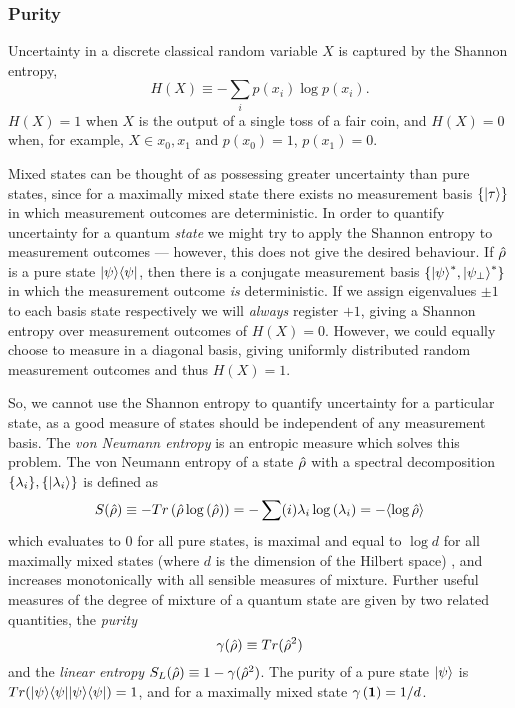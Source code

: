 \subsubsection{Purity}
Uncertainty in a discrete classical random variable $X$ is captured by the Shannon entropy, 
\begin{equation}
H(X) \equiv - \sum_i p(x_i) \log p(x_i).
\end{equation}
$H(X) = 1$ when $X$ is the output of a single toss of a fair coin, and $H(X) = 0$ when, for example, $X \in {x_0, x_1}$ and $p(x_0)=1$, $p(x_1)=0$.

Mixed states can be thought of as possessing greater uncertainty than pure states, since for a maximally mixed state there exists no measurement basis $\{ \mbox{$ | \tau \rangle $} \}$ in which measurement outcomes are deterministic.
In order to quantify uncertainty for a quantum \emph{state} we might try to apply the Shannon entropy to measurement outcomes --- however, this does not give the desired behaviour.  If $\hat{\rho}$ is a pure state $\mbox{$ | \psi \rangle $}\mbox{$ \langle \psi | $}$, then there is a conjugate measurement basis $\{\mbox{$ | \psi \rangle $}^*, \mbox{$ | \psi_\perp \rangle $}^* \}$ in which the measurement outcome \emph{is} deterministic. If we assign eigenvalues $\pm1$ to each basis state respectively we will \emph{always} register $+1$, giving a Shannon entropy over measurement outcomes of $H(X)=0$.  However, we could equally choose to measure in a diagonal basis, giving uniformly distributed random measurement outcomes and thus $H(X)=1$. 

So, we cannot use the Shannon entropy to quantify uncertainty for a particular state, as a good measure of states should be independent of any measurement basis.  
The \emph{von Neumann entropy} is an entropic measure which solves this problem. The von Neumann entropy of a state $\hat{\rho}$ with a spectral decomposition $\{\lambda_i\}, \{\mbox{$ | \lambda_i \rangle $} \}$ is defined as
\begin{equation}
S(\hat{\rho}) \equiv -Tr\left(\hat{\rho} \log \left( \hat{\rho} \right) \right) = -\sum(i) \lambda_i \log \left( \lambda_i \right) = -\langle \log \hat{\rho} \rangle
\end{equation}
which evaluates to 0 for all pure states, is maximal and equal to $\log d$ for all maximally mixed states (where $d$ is the dimension of the Hilbert space)
, and increases monotonically with all sensible measures of mixture.  Further useful measures of the degree of mixture of a quantum state are given by two related quantities, the \emph{purity} 
\begin{equation}
\gamma(\hat{\rho}) \equiv Tr(\hat{\rho}^2)
\label{eqn:purity}
\end{equation}
and the \emph{linear entropy} $S_L(\hat{\rho}) \equiv 1-\gamma(\hat{\rho}^2)$. The purity of a pure state $\mbox{$ | \psi \rangle $}$ is $Tr(\mbox{$ | \psi \rangle $}\mbox{$ \langle \psi | $}\mbox{$ | \psi \rangle $}\mbox{$ \langle \psi | $}) = 1$, and for a maximally mixed state $\gamma \left( \mathbf{1} \right) = 1/d$.

